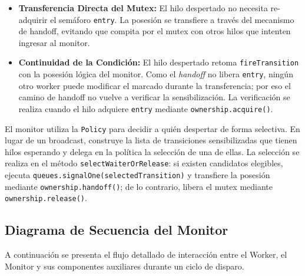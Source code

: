 \documentclass[11pt,a4paper]{article}
\begin{document}
      \begin{itemize}
          \item \textbf{Transferencia Directa del Mutex:} El hilo despertado no necesita re-adquirir el semáforo \texttt{entry}. La posesión se transfiere a través del mecanismo de handoff, evitando que compita por el mutex con otros hilos que intenten ingresar al monitor.
          \item \textbf{Continuidad de la Condición:} El hilo despertado retoma \texttt{fireTransition} con la posesión lógica del monitor. Como el \textit{handoff} no libera \texttt{entry}, ningún otro worker puede modificar el marcado durante la transferencia; por eso el camino de handoff no vuelve a verificar la sensibilización. La verificación se realiza cuando el hilo adquiere \texttt{entry} mediante \texttt{ownership.acquire()}.
 \end{itemize}

El monitor utiliza la \texttt{Policy} para decidir a quién despertar de forma selectiva. En lugar de un broadcast, construye la lista de transiciones sensibilizadas que tienen hilos esperando y delega en la política la selección de una de ellas. La selección se realiza en el método \texttt{selectWaiterOrRelease}: si existen candidatos elegibles, ejecuta \texttt{queues.signalOne(selectedTransition)} y transfiere la posesión mediante \texttt{ownership.handoff()}; de lo contrario, libera el mutex mediante \texttt{ownership.release()}.

\subsection{Diagrama de Secuencia del Monitor}

A continuación se presenta el flujo detallado de interacción entre el Worker, el Monitor y sus componentes auxiliares durante un ciclo de disparo.
\end{document}
